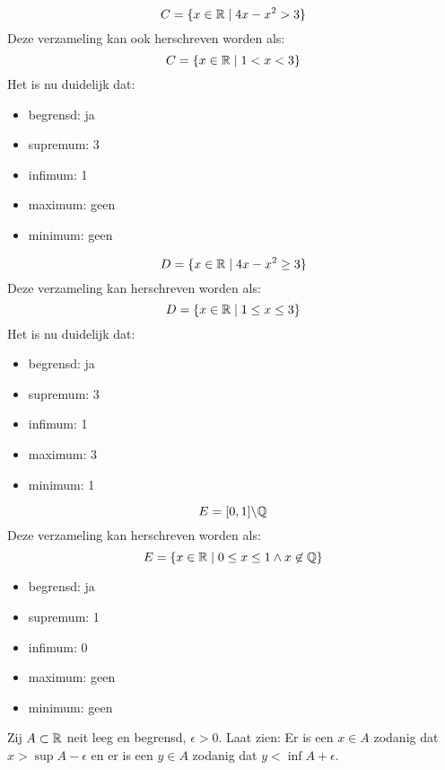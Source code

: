 \documentclass[week=1]{homework}
\begin{document}
\begin{questions}
        \[
	        C = \{ x \in \mathbb{R} \mid 4x - x^2 > 3 \}
        \]
        Deze verzameling kan ook herschreven worden als:
        \[
	        C = \{x \in \mathbb{R} \mid 1 < x < 3 \}
        \]
        Het is nu duidelijk dat:              
              \begin{itemize}
              	\item begrensd: ja
              	\item supremum: 3
              	\item infimum: 1
              	\item maximum: geen
              	\item minimum: geen
              \end{itemize}
        
        \[
	        D = \{ x \in \mathbb{R} \mid 4x - x^2 \geq 3 \}
        \]
        Deze verzameling kan herschreven worden als:
        \[
	        D = \{x \in \mathbb{R} \mid 1 \leq x \leq 3 \}
        \]    
        Het is nu duidelijk dat:
              \begin{itemize}
              	\item begrensd: ja
              	\item supremum: 3
              	\item infimum: 1
              	\item maximum: 3
              	\item minimum: 1
              \end{itemize}
          
        \[
	        E = [0,1]\backslash \mathbb{Q}
        \]    
        Deze verzameling kan herschreven worden als:
        \[
	        E = \{x \in \mathbb{R} \mid 0 \leq x \leq 1 \wedge x \not\in \mathbb{Q} \}
        \]
              \begin{itemize}
              	\item begrensd: ja
              	\item supremum: 1
              	\item infimum: 0
              	\item maximum: geen
              	\item minimum: geen
              \end{itemize}
                     
        \question
        Zij $A \subset \mathbb{R}$ neit leeg en begrensd, $\epsilon > 0$. Laat zien: Er is een $x \in A$ zodanig dat $x > \sup A - \epsilon$ en er is een $y \in A$ zodanig dat $y < \inf A + \epsilon$.
        

\end{questions}
\end{document}

